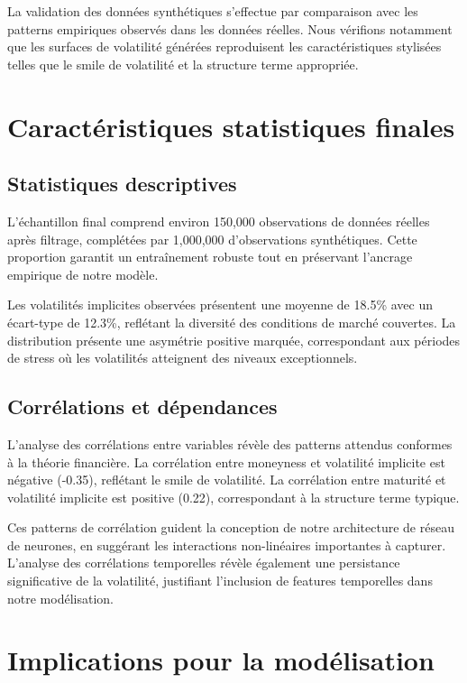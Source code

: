 La validation des données synthétiques s'effectue par comparaison avec les patterns empiriques observés dans les données réelles. Nous vérifions notamment que les surfaces de volatilité générées reproduisent les caractéristiques stylisées telles que le smile de volatilité et la structure terme appropriée.

\section{Caractéristiques statistiques finales}

\subsection{Statistiques descriptives}

L'échantillon final comprend environ 150,000 observations de données réelles après filtrage, complétées par 1,000,000 d'observations synthétiques. Cette proportion garantit un entraînement robuste tout en préservant l'ancrage empirique de notre modèle.

Les volatilités implicites observées présentent une moyenne de 18.5\% avec un écart-type de 12.3\%, reflétant la diversité des conditions de marché couvertes. La distribution présente une asymétrie positive marquée, correspondant aux périodes de stress où les volatilités atteignent des niveaux exceptionnels.

\subsection{Corrélations et dépendances}

L'analyse des corrélations entre variables révèle des patterns attendus conformes à la théorie financière. La corrélation entre moneyness et volatilité implicite est négative (-0.35), reflétant le smile de volatilité. La corrélation entre maturité et volatilité implicite est positive (0.22), correspondant à la structure terme typique.

Ces patterns de corrélation guident la conception de notre architecture de réseau de neurones, en suggérant les interactions non-linéaires importantes à capturer. L'analyse des corrélations temporelles révèle également une persistance significative de la volatilité, justifiant l'inclusion de features temporelles dans notre modélisation.

\section{Implications pour la modélisation}

